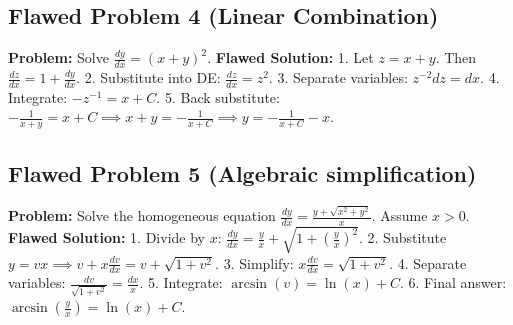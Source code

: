 \documentclass[11pt]{article}
\begin{document}
\subsection*{Flawed Problem 4 (Linear Combination)}
\textbf{Problem:} Solve $\frac{dy}{dx} = (x+y)^2$.
\textbf{Flawed Solution:}
1. Let $z = x+y$. Then $\frac{dz}{dx} = 1 + \frac{dy}{dx}$.
2. Substitute into DE: $\frac{dz}{dx} = z^2$.
3. Separate variables: $z^{-2} dz = dx$.
4. Integrate: $-z^{-1} = x + C$.
5. Back substitute: $-\frac{1}{x+y} = x + C \implies x+y = -\frac{1}{x+C} \implies y = -\frac{1}{x+C} - x$.

\subsection*{Flawed Problem 5 (Algebraic simplification)}
\textbf{Problem:} Solve the homogeneous equation $\frac{dy}{dx} = \frac{y + \sqrt{x^2+y^2}}{x}$. Assume $x > 0$.
\textbf{Flawed Solution:}
1. Divide by $x$: $\frac{dy}{dx} = \frac{y}{x} + \sqrt{1 + \left(\frac{y}{x}\right)^2}$.
2. Substitute $y = vx \implies v + x\frac{dv}{dx} = v + \sqrt{1+v^2}$.
3. Simplify: $x\frac{dv}{dx} = \sqrt{1+v^2}$.
4. Separate variables: $\frac{dv}{\sqrt{1+v^2}} = \frac{dx}{x}$.
5. Integrate: $\arcsin(v) = \ln(x) + C$.
6. Final answer: $\arcsin\left(\frac{y}{x}\right) = \ln(x) + C$.
\end{document}
